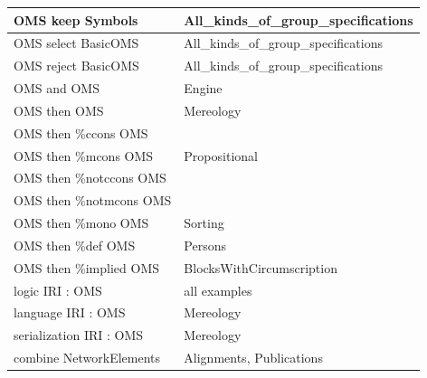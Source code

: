 \documentclass[10pt,fleqn,final]{scrreprt}
\begin{document}
\begin{tabular}{|l|l|}
OMS keep Symbols  & All\_kinds\_of\_group\_specifications \\\hline
OMS select BasicOMS  & All\_kinds\_of\_group\_specifications  \\\hline
OMS reject BasicOMS  & All\_kinds\_of\_group\_specifications \\\hline
OMS and OMS   & Engine \\\hline
OMS then OMS  & Mereology \\\hline
OMS then \%ccons OMS  &  \cite{DBLP:conf/ijcai/LutzWW07} \\\hline
OMS then \%mcons OMS  & Propositional \\\hline
OMS then \%notccons OMS  & \cite{DBLP:conf/ijcai/LutzWW07} \\\hline
OMS then \%notmcons OMS  & \cite{DBLP:conf/ijcai/LutzWW07} \\\hline
OMS then \%mono OMS  & Sorting \\\hline
OMS then \%def OMS  & Persons \\\hline
OMS then \%implied OMS  &  BlocksWithCircumscription \\\hline
logic IRI : OMS  &  all examples\\\hline
language IRI : OMS  &  Mereology\\\hline
serialization IRI : OMS  & Mereology \\\hline
combine NetworkElements  & Alignments, Publications \\\hline
\end{tabular}
\end{document}

